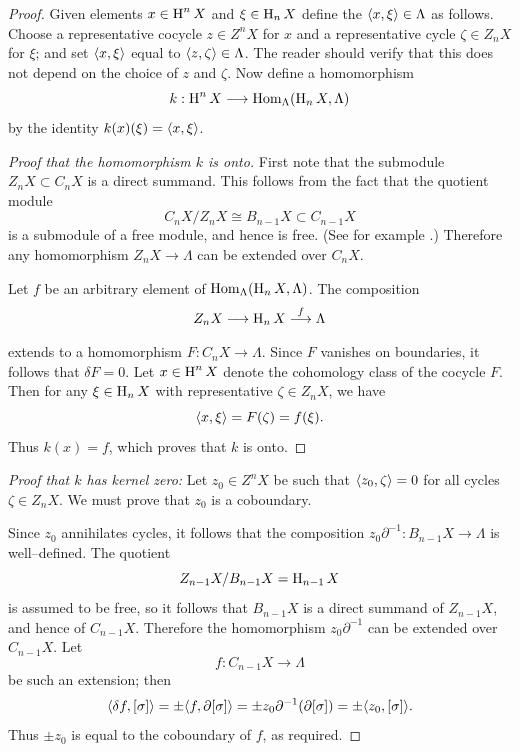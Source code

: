 \documentclass[../main]{subfiles}
\begin{document}
\begin{proof}
Given elements $x \in \operatorname{H}^n X$ and $\xi \in \operatorname{H}_n X$ define the  $\langle x,\xi\rangle \in \Lambda$ as follows. Choose a representative cocycle $z \in Z^n X$ for $x$ and a representative cycle $\zeta \in Z_n X$ for $\xi$; and set $\langle x,\xi\rangle$ equal to $\langle z,\zeta\rangle \in \Lambda$. The reader should verify that this does not depend on the choice of $z$ and $\zeta$. Now define a homomorphism \[k : \operatorname{H}^n X \longrightarrow \operatorname{Hom}_\Lambda(\operatorname{H}_n X, \Lambda)\] by the identity $k(x)(\xi) = \langle x,\xi\rangle$.

\begin{proof}[Proof that the homomorphism $k$ is onto]
First note that the submodule \newline $Z_n X \subset C_n X$ is a direct summand. This follows from the fact that the quotient module \[C_n X/Z_n X \cong B_{n - 1} X \subset C_{n - 1} X\] is a submodule of a free module, and hence is free. (See for example \cite{kaplansky2018infinite}.) Therefore any homomorphism $Z_n X \longrightarrow \Lambda$ can be extended over $C_n X$. 

Let $f$ be an arbitrary element of $\operatorname{Hom}_\Lambda(\operatorname{H}_n X, \Lambda)$. The composition \[Z_n X \varrightarrow{} \homology_n X \varrightarrow{f} \Lambda\] extends to a homomorphism $F : C_n X \longrightarrow \Lambda$. Since $F$ vanishes on boundaries, it follows that $\delta F = 0$. Let $x \in \operatorname{H}^n X$ denote the cohomology class of the cocycle $F$. Then for any $\xi \in \operatorname{H}_n X$ with representative $\zeta \in Z_n X$, we have \[\langle x,\xi\rangle = F(\zeta) = f(\xi).\] Thus $k(x) = f$, which proves that $k$ is onto. 
\end{proof}

\emph{Proof that $k$ has kernel zero:}
Let $z_0 \in Z^n X$ be such that $\langle z_0,\zeta\rangle = 0$ for all cycles $\zeta \in Z_n X$. We must prove that $z_0$ is a coboundary. 

Since $z_0$ annihilates cycles, it follows that the composition \newline $z_0 \partial^{-1} : B_{n - 1} X \longrightarrow \Lambda$ is well--defined. The quotient \[Z_{n - 1} X/B_{n - 1} X = \operatorname{H}_{n - 1} X\] is assumed to be free, so it follows that $B_{n - 1} X$ is a direct summand of $Z_{n - 1} X$, and hence of $C_{n - 1} X$. Therefore the homomorphism $z_0 \partial^{-1}$ can be extended over $C_{n - 1} X$. Let \[f : C_{n - 1} X \longrightarrow \Lambda\] be such an extension; then \[\langle\delta f,[\sigma]\rangle = \pm \langle f,\partial[\sigma]\rangle = \pm z_0 \partial^{-1} (\partial[\sigma]) = \pm \langle z_0,[\sigma]\rangle.\] Thus $\pm z_0$ is equal to the coboundary of $f$, as required.
\end{proof}
\end{document}
